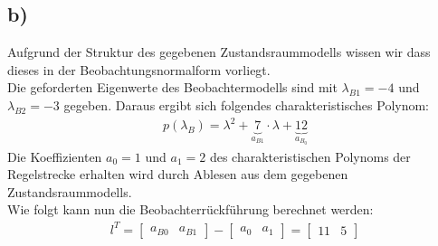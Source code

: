 \documentclass[11pt]{scrartcl} %
\begin{document}
\subsection*{b)}
Aufgrund der Struktur des gegebenen Zustandsraummodells wissen wir dass dieses in der Beobachtungsnormalform vorliegt.\\
Die geforderten Eigenwerte des Beobachtermodells sind mit $\lambda_{B1}=-4$ und $\lambda_{B2}=-3$ gegeben. Daraus ergibt sich folgendes charakteristisches Polynom:
\begin{align*}
	p(\lambda_B)=\lambda^2+\underbrace{7}_{a_{B1}}\cdot\lambda+\underbrace{12}_{a_{B_0}}
\end{align*}
Die Koeffizienten $a_0=1$ und $a_1=2$ des charakteristischen Polynoms der Regelstrecke erhalten wird durch Ablesen aus dem gegebenen Zustandsraummodells.\\
Wie folgt kann nun die Beobachterrückführung berechnet werden:
\begin{align*}
	l^T=\begin{bmatrix}a_{B0}&a_{B1}\end{bmatrix}-\begin{bmatrix}a_{0}&a_{1}\end{bmatrix}=\begin{bmatrix}11&5\end{bmatrix}
\end{align*}
\end{document}
